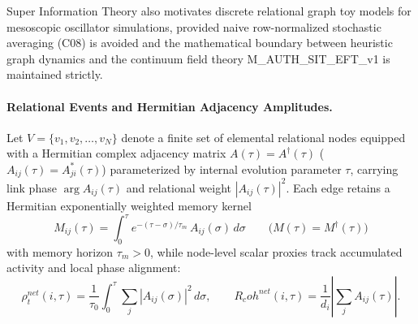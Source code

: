\documentclass[american,11pt,letterpaper]{article}
\newcommand{\Rcoh}{R_{\mathrm{coh}}}
\def\mathrm#1{#1}%
\def\texttt#1{#1}%
\def\Rcoh{R_coh}%
\begin{document}
Super Information Theory also motivates discrete relational graph toy models for mesoscopic oscillator simulations, provided naive row-normalized stochastic averaging (\texttt{C08}) is avoided and the mathematical boundary between heuristic graph dynamics and the continuum field theory \texttt{M\_AUTH\_SIT\_EFT\_v1} is maintained strictly.

\paragraph{Relational Events and Hermitian Adjacency Amplitudes.}
Let $V = \{v_1, v_2, \dots, v_N\}$ denote a finite set of elemental relational nodes equipped with a Hermitian complex adjacency matrix $A(\tau) = A^\dagger(\tau)$ ($A_{ij}(\tau) = A_{ji}^*(\tau)$) parameterized by internal evolution parameter $\tau$, carrying link phase $\arg A_{ij}(\tau)$ and relational weight $|A_{ij}(\tau)|^2$. Each edge retains a Hermitian exponentially weighted memory kernel
\begin{equation}
M_{ij}(\tau) = \int_0^\tau e^{-(\tau-\sigma)/\tau_m}\,A_{ij}(\sigma)\,d\sigma
\qquad \bigl(M(\tau) = M^\dagger(\tau)\bigr)
\end{equation}
with memory horizon $\tau_m > 0$, while node-level scalar proxies track accumulated activity and local phase alignment:
\begin{equation}
\rho_t^{\mathrm{net}}(i,\tau) = \frac{1}{\tau_0}\int_0^\tau \sum_j |A_{ij}(\sigma)|^2\,d\sigma,
\qquad
\Rcoh^{\mathrm{net}}(i,\tau) = \frac{1}{d_i}\left|\sum_j A_{ij}(\tau)\right|.
\end{equation}
\end{document}
